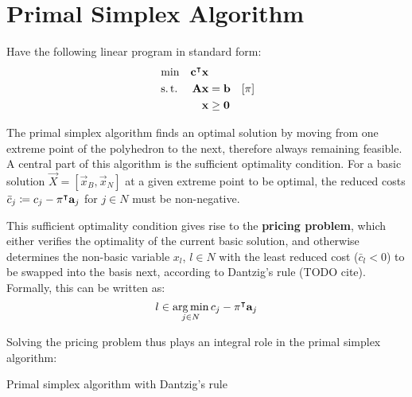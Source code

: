 \section{Primal Simplex Algorithm}\label{sec:preliminaries_psa}
Have the following linear program in standard form:
\begin{equation}\label{eq:lp_standard}
\begin{aligned}
&\min & \mathbf{c}^\intercal \mathbf{x} & & \\
&\operatorname{s.t.} & \mathbf{A} \mathbf{x} & = \mathbf{b} & \left[\mathbf{\pi}\right] \\
&& \mathbf{x} & \geq \mathbf{0} &
\end{aligned}
\end{equation}

The primal simplex algorithm finds an optimal solution by moving from one extreme point of the polyhedron to the next, therefore always remaining feasible. A central part of this algorithm is the sufficient optimality condition. For a basic solution $\vec{X} = \left[\vec{x}_B, \vec{x}_N\right]$ at a given extreme point to be optimal, the reduced costs $\bar{c}_j \coloneqq c_j - \mathbf{\pi}^\intercal \mathbf{a}_j$ for $j \in N$ must be non-negative.

This sufficient optimality condition gives rise to the \textbf{pricing problem}, which either verifies the optimality of the current basic solution, and otherwise determines the non-basic variable $x_l$, $l \in N$ with the least reduced cost ($\bar{c}_l < 0$) to be swapped into the basis next, according to Dantzig's rule (TODO cite). Formally, this can be written as:
\begin{equation}
l \in \underset{j \in N}{\arg\min} \, c_j - \mathbf{\pi}^\intercal \mathbf{a}_j
\end{equation}

Solving the pricing problem thus plays an integral role in the primal simplex algorithm:

\begin{algorithm}
\caption{Primal simplex algorithm with Dantzig's rule}
\end{algorithm}